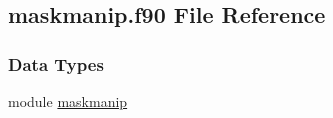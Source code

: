 \hypertarget{maskmanip_8f90}{\subsection{maskmanip.\-f90 File Reference}
\label{maskmanip_8f90}
}
\subsubsection*{Data Types}
\begin{DoxyCompactItemize}
\item 
module \hyperlink{classmaskmanip}{maskmanip}
\end{DoxyCompactItemize}
